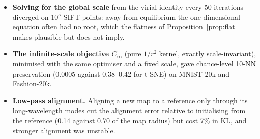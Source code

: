 \documentclass[11pt]{article}
\begin{document}
\begin{itemize}
$10^6$ points by 0.8--1.3\% on three of five datasets (medians of five seeds; 0.8--2.8\% on four of five with the
first three seeds, on which the sealed predictions about its cost were scored and failed) and did not prevent one
GloVe-100 run from stalling at KL 7.96. The results in the main text therefore use no cap.
\item \textbf{Solving for the global scale} from the virial identity every 50 iterations diverged on $10^5$ SIFT points:
away from equilibrium the one-dimensional equation often had no root, which the flatness of
Proposition~\ref{prop:flat} makes plausible but does not imply.
\item \textbf{The infinite-scale objective $C_\infty$} (pure $1/r^2$ kernel, exactly scale-invariant), minimised with the
same optimiser and a fixed scale, gave chance-level 10-NN preservation (0.0005 against 0.38--0.42 for t-SNE) on
MNIST-20k and Fashion-20k.
\item \textbf{Low-pass alignment.} Aligning a new map to a reference only through its long-wavelength modes cut the
alignment error relative to initialising from the reference (0.14 against 0.70 of the map radius) but cost 7\% in KL,
and stronger alignment was unstable.
\end{itemize}
\end{document}

